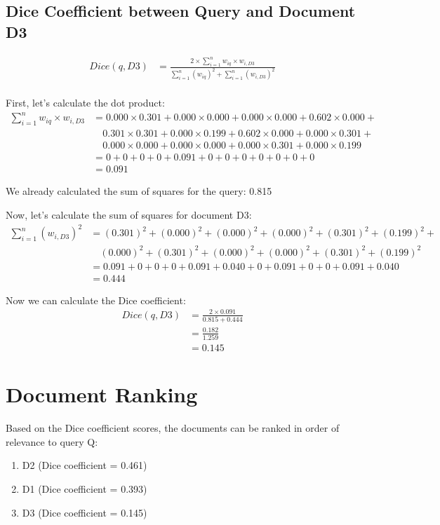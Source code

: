 \documentclass{article}
\begin{document}
\subsection{Dice Coefficient between Query and Document D3}
\begin{align}
Dice(q, D3) &= \frac{2 \times \sum_{i=1}^{n} w_{iq} \times w_{i,D3}}{\sum_{i=1}^{n} (w_{iq})^2 + \sum_{i=1}^{n} (w_{i,D3})^2} \\
\end{align}

First, let's calculate the dot product:
\begin{align}
\sum_{i=1}^{n} w_{iq} \times w_{i,D3} &= 0.000 \times 0.301 + 0.000 \times 0.000 + 0.000 \times 0.000 + 0.602 \times 0.000 + \\
&\quad 0.301 \times 0.301 + 0.000 \times 0.199 + 0.602 \times 0.000 + 0.000 \times 0.301 + \\
&\quad 0.000 \times 0.000 + 0.000 \times 0.000 + 0.000 \times 0.301 + 0.000 \times 0.199 \\
&= 0 + 0 + 0 + 0 + 0.091 + 0 + 0 + 0 + 0 + 0 + 0 + 0 \\
&= 0.091
\end{align}

We already calculated the sum of squares for the query: 0.815

Now, let's calculate the sum of squares for document D3:
\begin{align}
\sum_{i=1}^{n} (w_{i,D3})^2 &= (0.301)^2 + (0.000)^2 + (0.000)^2 + (0.000)^2 + (0.301)^2 + (0.199)^2 + \\
&\quad (0.000)^2 + (0.301)^2 + (0.000)^2 + (0.000)^2 + (0.301)^2 + (0.199)^2 \\
&= 0.091 + 0 + 0 + 0 + 0.091 + 0.040 + 0 + 0.091 + 0 + 0 + 0.091 + 0.040 \\
&= 0.444
\end{align}

Now we can calculate the Dice coefficient:
\begin{align}
Dice(q, D3) &= \frac{2 \times 0.091}{0.815 + 0.444} \\
&= \frac{0.182}{1.259} \\
&= 0.145
\end{align}

\section{Document Ranking}
Based on the Dice coefficient scores, the documents can be ranked in order of relevance to query Q:
\begin{enumerate}
\item D2 (Dice coefficient = 0.461)
\item D1 (Dice coefficient = 0.393)
\item D3 (Dice coefficient = 0.145)
\end{enumerate}
\end{document}
